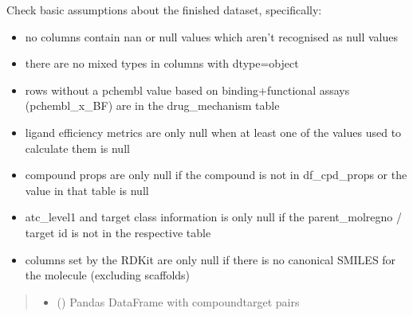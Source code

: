 \documentclass[letterpaper,10pt,english]{sphinxmanual}
\begin{document}
\begin{fulllineitems}
\label{\detokenize{sanity_checks:sanity_checks.sanity_checks}}
\pysigstartsignatures
{}
\pysigstopsignatures
\sphinxAtStartPar
Check basic assumptions about the finished dataset, specifically:
\begin{itemize}
\item {} 
\sphinxAtStartPar
no columns contain nan or null values which aren’t recognised as null values

\item {} 
\sphinxAtStartPar
there are no mixed types in columns with dtype=object

\item {} 
\sphinxAtStartPar
rows without a pchembl value based on binding+functional assays (pchembl\_x\_BF) are in the drug\_mechanism table

\item {} 
\sphinxAtStartPar
ligand efficiency metrics are only null when at least one of the values used to calculate them is null

\item {} 
\sphinxAtStartPar
compound props are only null if the compound is not in df\_cpd\_props or the value in that table is null

\item {} 
\sphinxAtStartPar
atc\_level1 and target class information is only null if the parent\_molregno / target id is not in the respective table

\item {} 
\sphinxAtStartPar
columns set by the RDKit are only null if there is no canonical SMILES for the molecule (excluding scaffolds)

\end{itemize}
\begin{quote}\begin{description}
\begin{itemize}
\item {} 
\sphinxAtStartPar
{} () \textendash{} Pandas DataFrame with compound\sphinxhyphen{}target pairs


\end{itemize}
\end{description}
\end{quote}
\end{fulllineitems}
\end{document}
